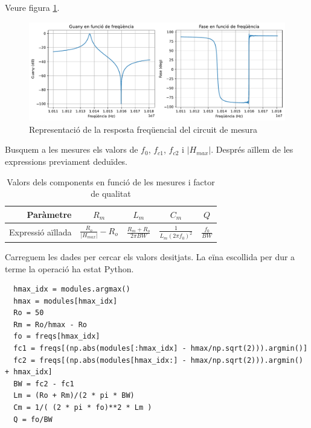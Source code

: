 \documentclass[catalan, a4paper, nobib]{tufte-handout}
\begin{document}
 Veure figura \ref{fig:resposta_frequencial}.

\begin{figure}[h]
  \includegraphics[width=\linewidth]{resposta_frequencial.pdf}
  \caption{Representació de la resposta freqüencial del circuit de mesura}
  \label{fig:resposta_frequencial}
\end{figure}

 Busquem a les mesures els valors de $f_0$, $f_{c1}$, $f_{c2}$ i $|H_{max}|$. Després aïllem de les expressions previament deduïdes.

\begin{table}
  \begin{center}
    \begin{tabular}{@{}rcccc@{}}
      \toprule
      Paràmetre & $R_m$ & $L_m$ & $C_m$ & $Q$ \\
      \midrule
      Expressió aïllada& $\frac{R_o}{|H_{max}|} - R_o$ & $\frac{R_m + R_o}{2 \pi BW}$ & $\frac{1}{L_m (2 \pi f_0)^2}$ & $\frac{f_0}{BW}$ \\
      \bottomrule
    \end{tabular}
  \end{center}
  \caption{Valors dels components en funció de les mesures i factor de qualitat}
\end{table}

\newthought{} Carreguem les dades per cercar els valors desitjats. La eïna escollida per dur a terme la operació ha estat Python.

\begin{verbatim}
  hmax_idx = modules.argmax()
  hmax = modules[hmax_idx]
  Ro = 50
  Rm = Ro/hmax - Ro
  fo = freqs[hmax_idx]
  fc1 = freqs[(np.abs(modules[:hmax_idx] - hmax/np.sqrt(2))).argmin()]
  fc2 = freqs[(np.abs(modules[hmax_idx:] - hmax/np.sqrt(2))).argmin() + hmax_idx]
  BW = fc2 - fc1
  Lm = (Ro + Rm)/(2 * pi * BW)
  Cm = 1/( (2 * pi * fo)**2 * Lm )
  Q = fo/BW
\end{verbatim}
\end{document}
